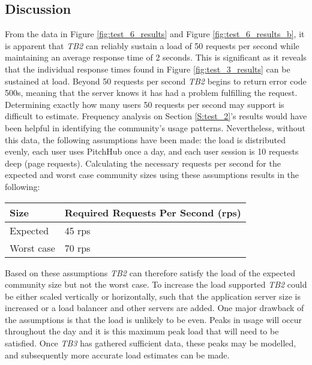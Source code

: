\subsection{Discussion}
From the data in Figure \ref{fig:test_6_results} and Figure \ref{fig:test_6_results_b}, it is apparent that \textit{TB2} can reliably sustain a load of 50 requests per second while maintaining an average response time of 2 seconds. This is significant as it reveals that the individual response times found in Figure \ref{fig:test_3_results} can be sustained at load. Beyond 50 requests per second \textit{TB2} begins to return error code 500s, meaning that the server knows it has had a problem fulfilling the request.
Determining exactly how many users 50 requests per second may support is difficult to estimate. Frequency analysis on Section \ref{S:test_2}'s results would have been helpful in identifying the community's usage patterns. Nevertheless, without this data, the following assumptions have been made: the load is distributed evenly, each user uses PitchHub once a day, and each user session is 10 requests deep (page requests). Calculating the necessary requests per second for the expected and worst case community sizes using these assumptions results in the following:

\begin {table}[H]
\begin{center}
\begin{tabular}{ |p{2cm}||p{6cm}| }
 \hline
 Size & Required Requests Per Second (rps)\\
 \hline
    Expected & 45 rps\\
 \hline
    Worst case & 70 rps\\
 \hline
\end{tabular}
\end{center}
\end{table}
Based on these assumptions \textit{TB2} can therefore satisfy the load of the expected community size but not the worst case. To increase the load supported \textit{TB2} could be either scaled vertically or horizontally, such that the application server size is increased or a load balancer and other servers are added. 
One major drawback of the assumptions is that the load is unlikely to be even. Peaks in usage will occur throughout the day and it is this maximum peak load that will need to be satisfied. Once \textit{TB3} has gathered sufficient data, these peaks may be modelled, and subsequently more accurate load estimates can be made.
